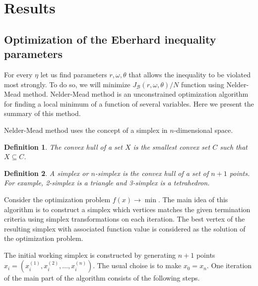 \documentclass[%
master,         %
subf,           %
href,           %
colorlinks=true %
]{disser}
\numberwithin{equation}{section}
\numberwithin{figure}{section}
\newtheorem{definition}{Definition}[section]
\begin{document}
\section{Results}
\subsection{Optimization of the Eberhard inequality parameters }
For every $\eta$ let us find parameters $r, \omega, \theta$ that allows the inequality to be violated most strongly.
To do so, we will minimize $J_{\mathcal{B}}(r, \omega, \theta) / N$ function using Nelder-Mead method. Nelder-Mead method is an unconstrained optimization algorithm for finding a local minimum of a function of several variables. Here we present the summary of this method.

Nelder-Mead method uses the concept of a simplex in $n$-dimensional space. 

\begin{definition}
The convex hull of a set $X$ is the smallest convex set $C$ such that $X \subseteq C$.
\end{definition}
\begin{definition}
A simplex or $n$-simplex is the convex hull of a set of $n+1$ points. For example, 2-simplex is a triangle and 3-simplex is a tetrahedron.
\end{definition}

Consider the optimization problem $f(x) \to \min$. The main idea of this algorithm is to construct a simplex which vertices matches the given termination criteria using simplex transformations on each iteration. The best vertex of the resulting simplex with associated function value is considered as the solution of the optimization problem.

The initial working simplex is constructed by generating $n+1$ points $x_i = \left(x^{(1)}_i,x^{(2)}_i,\ldots,x^{(n)}_i\right)$. The usual choise is to make $x_0 = x_n$. One iteration of the main part of the algorithm consists of the following steps.
\end{document}
